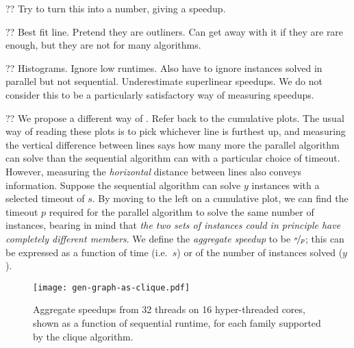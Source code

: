 \documentclass[sigconf]{acmart}
\begin{document}
?? Try to turn this into a number, giving a speedup.

?? Best fit line. Pretend they are outliners. Can get away with it if they are rare enough, but they
are not for many algorithms.

?? Histograms. Ignore low runtimes. Also have to ignore instances solved in parallel but not
sequential. Underestimate superlinear speedups. We do not consider this to be a particularly
satisfactory way of measuring speedups.

?? We propose a different way of . Refer back to the cumulative plots. The usual way of reading
these plots is to pick whichever line is furthest up, and measuring the vertical difference between
lines says how many more the parallel algorithm can solve than the sequential algorithm can with a
particular choice of timeout. However, measuring the \emph{horizontal} distance between lines also
conveys information. Suppose the sequential algorithm can solve $y$ instances with a selected timeout
of $s$. By moving to the left on a cumulative plot, we can find the timeout $p$ required for the
parallel algorithm to solve the same number of instances, bearing in mind that \emph{the two sets of
instances could in principle have completely different members}. We define the \emph{aggregate
speedup} to be $\nicefrac{s}{p}$; this can be expressed as a function of time (i.e.\ $s$) or of the
number of instances solved ($y$).

\begin{figure}[p]
    \texttt{[image: gen-graph-as-clique.pdf]}

    \caption{Aggregate speedups from 32 threads on 16 hyper-threaded cores, shown as a function of
    sequential runtime, for each family supported by the clique algorithm.}
\end{figure}
\end{document}
